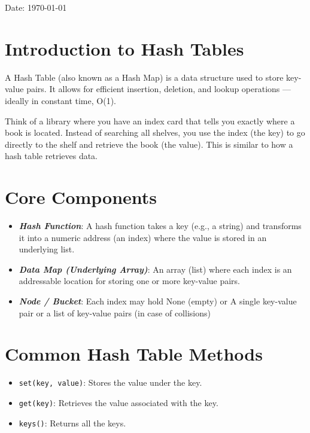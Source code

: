 \documentclass{thesisnotes}
\begin{document}
\begin{tcolorbox}[mytitlebox, title=Hash Tables]
  Date: \today
\end{tcolorbox}

\section*{Introduction to Hash Tables}

A Hash Table (also known as a Hash Map) is a data structure used to store key-value pairs. It allows for efficient insertion, deletion, and lookup operations — ideally in constant time, O(1).

Think of a library where you have an index card that tells you exactly where a book is located. Instead of searching all shelves, you use the index (the key) to go directly to the shelf and retrieve the book (the value).
This is similar to how a hash table retrieves data.


\section*{Core Components}
\begin{itemize}
    \item \textbf{\textit{Hash Function}}: A hash function takes a key (e.g., a string) and transforms it into a numeric address (an index) where the value is stored in an underlying list.
    \item \textbf{\textit{Data Map (Underlying Array)}}: An array (list) where each index is an addressable location for storing one or more key-value pairs.
    \item \textbf{\textit{Node / Bucket}}: Each index may hold None (empty)
    or  A single key-value pair or a list of key-value pairs (in case of collisions)
\end{itemize}

\section*{Common Hash Table Methods}
\begin{itemize}
    \item \texttt{set(key, value)}: Stores the value under the key.
    \item \texttt{get(key)}: Retrieves the value associated with the key.
    \item \texttt{keys()}: Returns all the keys.
\end{itemize}
\end{document}
